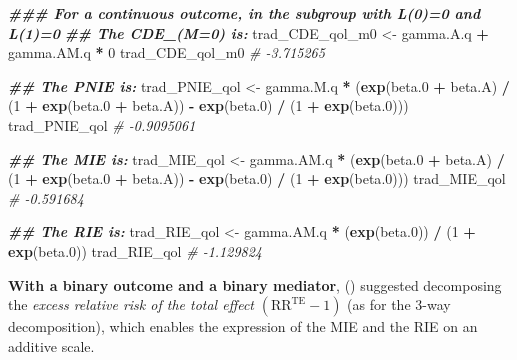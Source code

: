 \documentclass[
]{book}
\newenvironment{Shaded}{\begin{snugshade}}{\end{snugshade}}
\newcommand{\CommentTok}[1]{\textcolor[rgb]{0.56,0.35,0.01}{\textit{#1}}}
\newcommand{\DecValTok}[1]{\textcolor[rgb]{0.00,0.00,0.81}{#1}}
\newcommand{\DocumentationTok}[1]{\textcolor[rgb]{0.56,0.35,0.01}{\textbf{\textit{#1}}}}
\newcommand{\FloatTok}[1]{\textcolor[rgb]{0.00,0.00,0.81}{#1}}
\newcommand{\FunctionTok}[1]{\textcolor[rgb]{0.13,0.29,0.53}{\textbf{#1}}}
\newcommand{\NormalTok}[1]{#1}
\newcommand{\OtherTok}[1]{\textcolor[rgb]{0.56,0.35,0.01}{#1}}
\newcommand{\SpecialCharTok}[1]{\textcolor[rgb]{0.81,0.36,0.00}{\textbf{#1}}}
\begin{document}
\begin{Shaded}
\begin{Highlighting}[]
\DocumentationTok{\#\#\# For a continuous outcome, in the subgroup with L(0)=0 and L(1)=0}
\DocumentationTok{\#\# The CDE\_(M=0) is:}
\NormalTok{trad\_CDE\_qol\_m0 }\OtherTok{\textless{}{-}}\NormalTok{ gamma.A.q }\SpecialCharTok{+}\NormalTok{ gamma.AM.q }\SpecialCharTok{*} \DecValTok{0}
\NormalTok{trad\_CDE\_qol\_m0}
\CommentTok{\# {-}3.715265}

\DocumentationTok{\#\# The PNIE is:}
\NormalTok{trad\_PNIE\_qol }\OtherTok{\textless{}{-}}\NormalTok{ gamma.M.q }\SpecialCharTok{*}
\NormalTok{  (}\FunctionTok{exp}\NormalTok{(beta}\FloatTok{.0} \SpecialCharTok{+}\NormalTok{ beta.A) }\SpecialCharTok{/}
\NormalTok{     (}\DecValTok{1} \SpecialCharTok{+} \FunctionTok{exp}\NormalTok{(beta}\FloatTok{.0} \SpecialCharTok{+}\NormalTok{ beta.A)) }\SpecialCharTok{{-}} \FunctionTok{exp}\NormalTok{(beta}\FloatTok{.0}\NormalTok{) }\SpecialCharTok{/}\NormalTok{ (}\DecValTok{1} \SpecialCharTok{+} \FunctionTok{exp}\NormalTok{(beta}\FloatTok{.0}\NormalTok{)))}
\NormalTok{trad\_PNIE\_qol}
\CommentTok{\# {-}0.9095061}

\DocumentationTok{\#\# The MIE is:}
\NormalTok{trad\_MIE\_qol }\OtherTok{\textless{}{-}}\NormalTok{ gamma.AM.q }\SpecialCharTok{*}
\NormalTok{  (}\FunctionTok{exp}\NormalTok{(beta}\FloatTok{.0} \SpecialCharTok{+}\NormalTok{ beta.A) }\SpecialCharTok{/}\NormalTok{ (}\DecValTok{1} \SpecialCharTok{+} \FunctionTok{exp}\NormalTok{(beta}\FloatTok{.0} \SpecialCharTok{+}\NormalTok{ beta.A)) }\SpecialCharTok{{-}}
     \FunctionTok{exp}\NormalTok{(beta}\FloatTok{.0}\NormalTok{) }\SpecialCharTok{/}\NormalTok{ (}\DecValTok{1} \SpecialCharTok{+} \FunctionTok{exp}\NormalTok{(beta}\FloatTok{.0}\NormalTok{)))}
\NormalTok{trad\_MIE\_qol}
\CommentTok{\# {-}0.591684}

\DocumentationTok{\#\# The RIE is:}
\NormalTok{trad\_RIE\_qol }\OtherTok{\textless{}{-}}\NormalTok{ gamma.AM.q }\SpecialCharTok{*}\NormalTok{ (}\FunctionTok{exp}\NormalTok{(beta}\FloatTok{.0}\NormalTok{)) }\SpecialCharTok{/}\NormalTok{ (}\DecValTok{1} \SpecialCharTok{+} \FunctionTok{exp}\NormalTok{(beta}\FloatTok{.0}\NormalTok{))}
\NormalTok{trad\_RIE\_qol}
\CommentTok{\# {-}1.129824}
\end{Highlighting}
\end{Shaded}

\textbf{With a binary outcome and a binary mediator}, () suggested decomposing the \emph{excess relative risk of the total effect} \((\text{RR}^{\text{TE}}-1)\) (as for the 3-way decomposition), which enables the expression of the MIE and the RIE on an additive scale.
\end{document}
